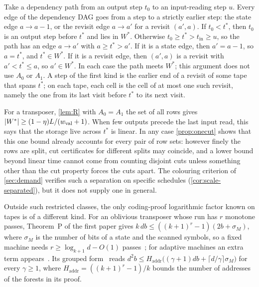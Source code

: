\begin{informalproof}
Take a dependency path from an output step $t_0$ to an input-reading step $u$. Every edge of the dependency DAG goes from a step to
a strictly earlier step: the state edge $a\to a-1$, or the revisit edge $a\to a'$ for a revisit $(a',a)$. If $t_0<t^*$, then $t_0$ is
an output step before $t^*$ and lies in $W^*$. Otherwise $t_0\ge t^*>t_{\mathrm{in}}\ge u$, so the path has an edge $a\to a'$ with
$a\ge t^*>a'$. If it is a state edge, then $a'=a-1$, so $a=t^*$, and $t^*\in W^*$. If it is a revisit edge, then $(a',a)$ is a revisit
with $a'<t^*\le a$, so $a'\in W^*$. In each case the path meets $W^*$; this argument does not use $A_0$ or $A_1$. A step of the first kind
is the earlier end of a revisit of some tape that spans $t^*$; on each tape, each cell is the cell of at most one such revisit, namely
the one from its last visit before $t^*$ to its next visit.
\end{informalproof}

For a transposer, \cref{lem:R} with $A_0=A_1$ the set of all rows gives $\lvert W^* \rvert\ge(1-\eta)L/(w_{\mathrm{val}}+1)$. When few outputs precede the last
input read, this says that the storage live across $t^*$ is linear. In any case \cref{prop:onecut} shows that this one bound already
accounts for every pair of row sets: however finely the rows are split, cut certificates for different splits may coincide, and a lower bound
beyond linear time cannot come from counting disjoint cuts unless something other than the cut property forces the cuts apart. The
colouring criterion of \cref{sec:demand} verifies such a separation on specific schedules (\cref{cor:scale-separated}), but it does not supply
one in general.

Outside such restricted classes, the only coding-proof logarithmic factor known on tapes is of a different kind. For an oblivious transposer
whose run has $r$ monotone passes, Theorem~P of the first paper gives $k\,db\le((k+1)^r-1)(2b+\sigma_M)$, where $\sigma_M$ is the number of
bits of a state and the scanned symbols, so a fixed machine needs $r\ge\log_{k+1}d-O(1)$ passes~\cite[Theorem~5.9]{FirstPaper2026}; for
adaptive machines an extra term appears~\cite[Theorem~5.12]{FirstPaper2026}. Its grouped form~\cite[Theorem~5.8]{FirstPaper2026} reads
$d^2b\le H_{\mathrm{addr}}\bigl((\gamma+1)db+\lceil d/\gamma\rceil\sigma_M\bigr)$ for every $\gamma\ge1$, where $H_{\mathrm{addr}}=((k+1)^r-1)/k$
bounds the number of addresses of the forests in its proof.

